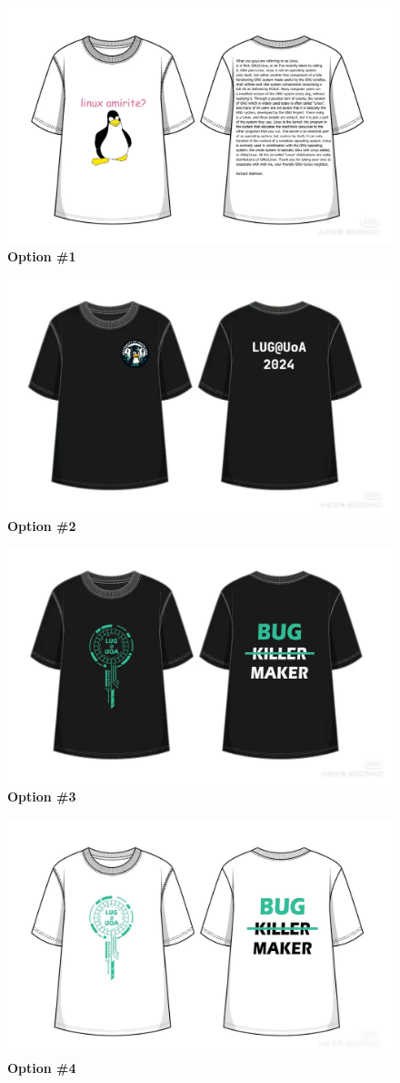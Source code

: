 \documentclass[11pt,fleqn]{article}
\begin{document}
\newpage


\begin{figure}
  \centering
  \includegraphics[width=0.56\linewidth]{res/A_Linux.png}
  \caption*{\Large{\textbf{Option \#1}}}
\end{figure}

\begin{figure}
  \centering
  \includegraphics[width=0.56\linewidth]{res/image.png}
  \caption*{\Large{\textbf{Option \#2}}}
\end{figure}

\begin{figure}
  \centering
  \includegraphics[width=0.56\linewidth]{res/mmexport1721729551948.png}
  \caption*{\Large{\textbf{Option \#3}}}
\end{figure}

\begin{figure}
  \centering
  \includegraphics[width=0.56\linewidth]{res/mmexport1721729557489.png}
  \caption*{\Large{\textbf{Option \#4}}}
\end{figure}
\end{document}
